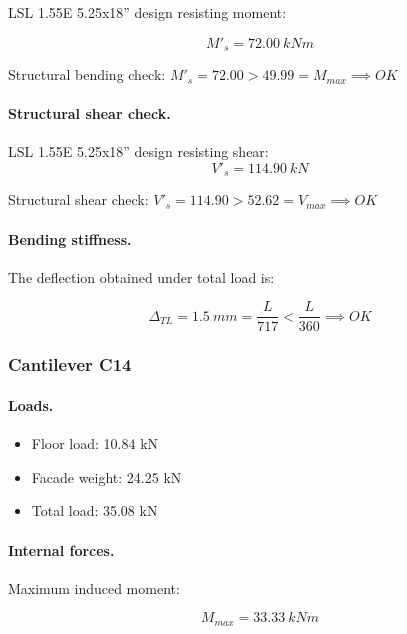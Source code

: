 \noindent LSL 1.55E 5.25x18'' design resisting moment:

\begin{equation}
  M'_s= 72.00\ kN m
\end{equation}

\noindent Structural bending check: $M'_s = 72.00 > 49.99 = M_{max} \implies OK$

\paragraph{Structural shear check.}

\noindent LSL 1.55E 5.25x18'' design resisting shear:
\begin{equation}
  V'_s= 114.90\ kN
\end{equation}

\noindent Structural shear check: $V'_s = 114.90 > 52.62 = V_{max} \implies OK$

\paragraph{Bending stiffness.}
The deflection obtained under total load is:

\begin{equation}
  \Delta_{TL}= 1.5\ mm= \frac{L}{717} < \frac{L}{360} \implies OK
\end{equation}

\subsubsection{Cantilever C14}

\paragraph{Loads.}

\begin{itemize}
\item Floor load: 10.84 kN
\item Facade weight: 24.25 kN
\item Total load: 35.08 kN
\end{itemize}

\paragraph{Internal forces.}

\noindent Maximum induced moment:

\begin{equation}
  M_{max}= 33.33\ kN m
\end{equation}

